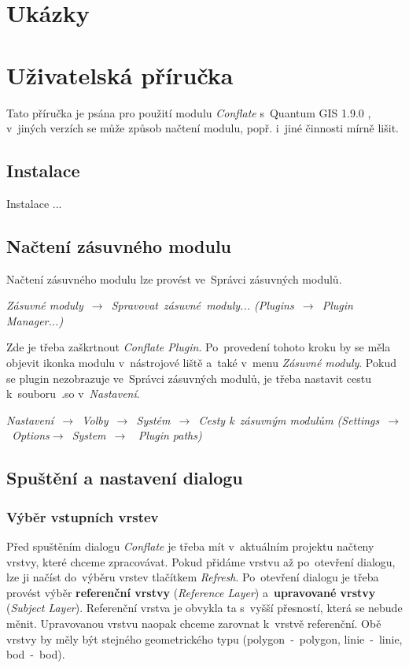 \section{Ukázky}
\label{plugin-ukazky}


\section{Uživatelská příručka} %
\label{prirucka}

Tato příručka je psána pro použití modulu \textit{Conflate} s~Quantum GIS 1.9.0 , 
v~jiných verzích se může způsob načtení modulu, popř. i~jiné činnosti mírně lišit.

\subsection{Instalace}
\label{prirucka-instalace}
Instalace ... %


\subsection{Načtení zásuvného modulu}
\label{prirucka-nacteni}

Načtení zásuvného modulu lze provést ve~Správci zásuvných modulů.
\begin{center}
\textit{Zásuvné moduly~$\rightarrow$~Spravovat~zásuvné~moduly... 
(Plugins~$\rightarrow$~Plugin Manager...)}
\end{center}
Zde je třeba zaškrtnout \textit{Conflate Plugin}. Po~provedení tohoto kroku by se 
měla objevit ikonka modulu v~nástrojové liště a~také v~menu \textit{Zásuvné moduly}. 
Pokud se plugin nezobrazuje ve~Správci zásuvných modulů, je třeba nastavit cestu 
k~souboru~.so v~\textit{Nastavení}.
\begin{center} 
\textit{Nastavení~$\rightarrow$~Volby~$\rightarrow$~Systém~$\rightarrow$~Cesty 
k~zásuvným modulům (Settings~$\rightarrow$~Options$\rightarrow$~System~$\rightarrow$
~Plugin paths)}
\end{center}


\subsection{Spuštění a nastavení dialogu}
\label{prirucka-spusteni}

\subsubsection{Výběr vstupních vrstev}
Před spuštěním dialogu \textit{Conflate} je třeba mít v~aktuálním projektu 
načteny vrstvy, které chceme zpracovávat. Pokud přidáme vrstvu až po~otevření
dialogu, lze ji načíst do~výběru vrstev tlačítkem \textit{Refresh}.
Po~otevření dialogu je třeba provést výběr \textbf{referenční vrstvy} 
(\textit{Reference Layer}) a~\textbf{upravované vrstvy} (\textit{Subject Layer}). 
Referenční vrstva je obvykla ta s~vyšší přesností, která se nebude měnit. 
Upravovanou vrstvu naopak chceme zarovnat k~vrstvě referenční. 
Obě vrstvy by měly být stejného geometrického typu (polygon~-~polygon, 
linie~-~linie, bod~-~bod).


